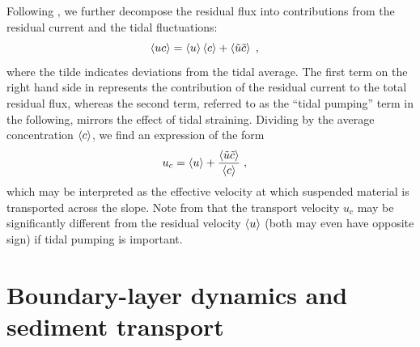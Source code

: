 Following \cite{Burchardetal2013a}, we further decompose the residual
flux into contributions from the residual current and the tidal
fluctuations:
\begin{equation}
  \label{splitflux}
   \left\langle uc \right\rangle = \left\langle u \right\rangle \left\langle c \right\rangle  
             + \left\langle  \tilde{u} \tilde{c}  \right\rangle
             \; , \quad
\end{equation}
where the tilde indicates deviations from the tidal average. The first
term on the right hand side in  represents the
contribution of the residual current to the total residual flux,
whereas the second term, referred to as the ``tidal pumping'' term in
the following, mirrors the effect of tidal straining. Dividing
 by the average concentration $\left\langle c \right\rangle$, we find an
expression of the form
\begin{equation}
  \label{uc}
   u_c = \left\langle u \right\rangle 
             + \dfrac{ \left\langle  \tilde{u} \tilde{c}  \right\rangle }{\left\langle c \right\rangle}
             \; , \quad
\end{equation}
which may be interpreted as the effective velocity at which suspended
material is transported across the slope. Note from  that the
transport velocity $u_c$ may be significantly different from the
residual velocity $\left\langle u \right\rangle$ (both may even have opposite sign) if
tidal pumping is important.

\section{Boundary-layer dynamics and sediment transport\label{sec:bbl}}

